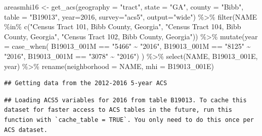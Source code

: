 \documentclass[
]{article}
\newenvironment{Shaded}{\begin{snugshade}}{\end{snugshade}}
\newcommand{\AttributeTok}[1]{\textcolor[rgb]{0.77,0.63,0.00}{#1}}
\newcommand{\DecValTok}[1]{\textcolor[rgb]{0.00,0.00,0.81}{#1}}
\newcommand{\FunctionTok}[1]{\textcolor[rgb]{0.00,0.00,0.00}{#1}}
\newcommand{\NormalTok}[1]{#1}
\newcommand{\OtherTok}[1]{\textcolor[rgb]{0.56,0.35,0.01}{#1}}
\newcommand{\SpecialCharTok}[1]{\textcolor[rgb]{0.00,0.00,0.00}{#1}}
\newcommand{\StringTok}[1]{\textcolor[rgb]{0.31,0.60,0.02}{#1}}
\begin{document}
\begin{Shaded}
\begin{Highlighting}[]
\NormalTok{areasmhi16 }\OtherTok{\textless{}{-}} \FunctionTok{get\_acs}\NormalTok{(}\AttributeTok{geography =} \StringTok{"tract"}\NormalTok{, }\AttributeTok{state =} \StringTok{"GA"}\NormalTok{, }\AttributeTok{county =} \StringTok{"Bibb"}\NormalTok{, }\AttributeTok{table =} \StringTok{"B19013"}\NormalTok{, }\AttributeTok{year=}\DecValTok{2016}\NormalTok{, }\AttributeTok{survey=}\StringTok{"acs5"}\NormalTok{, }\AttributeTok{output=}\StringTok{"wide"}\NormalTok{) }\SpecialCharTok{\%\textgreater{}\%}
\FunctionTok{filter}\NormalTok{(NAME }\SpecialCharTok{\%in\%} \FunctionTok{c}\NormalTok{(}\StringTok{"Census Tract 101, Bibb County, Georgia"}\NormalTok{, }\StringTok{"Census Tract 104, Bibb County, Georgia"}\NormalTok{, }\StringTok{"Census Tract 102, Bibb County, Georgia"}\NormalTok{)) }\SpecialCharTok{\%\textgreater{}\%}
\FunctionTok{mutate}\NormalTok{(}\AttributeTok{year =} \FunctionTok{case\_when}\NormalTok{(}
\NormalTok{  B19013\_001M }\SpecialCharTok{==} \StringTok{"5466"} \SpecialCharTok{\textasciitilde{}} \StringTok{"2016"}\NormalTok{,}
\NormalTok{  B19013\_001M }\SpecialCharTok{==} \StringTok{"8125"} \SpecialCharTok{\textasciitilde{}} \StringTok{"2016"}\NormalTok{,}
\NormalTok{  B19013\_001M }\SpecialCharTok{==} \StringTok{"3078"} \SpecialCharTok{\textasciitilde{}} \StringTok{"2016"}\NormalTok{) ) }\SpecialCharTok{\%\textgreater{}\%}
\FunctionTok{select}\NormalTok{(NAME, B19013\_001E, year) }\SpecialCharTok{\%\textgreater{}\%}
\FunctionTok{rename}\NormalTok{(}\AttributeTok{neighborhood =}\NormalTok{ NAME, }\AttributeTok{mhi =}\NormalTok{ B19013\_001E)}
\end{Highlighting}
\end{Shaded}

\begin{verbatim}
## Getting data from the 2012-2016 5-year ACS
\end{verbatim}

\begin{verbatim}
## Loading ACS5 variables for 2016 from table B19013. To cache this dataset for faster access to ACS tables in the future, run this function with `cache_table = TRUE`. You only need to do this once per ACS dataset.
\end{verbatim}
\end{document}
